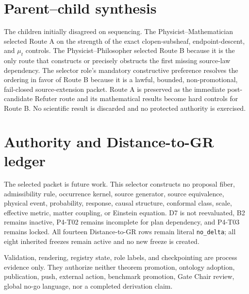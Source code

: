 \documentclass[11pt]{article}
\begin{document}
\section{Parent--child synthesis}

The children initially disagreed on sequencing. The Physicist--Mathematician
selected Route A on the strength of the exact clopen-subsheaf, endpoint-descent,
and \(\mu_t\) controls. The Physicist--Philosopher selected Route B because it
is the only route that constructs or precisely obstructs the first missing
source-law dependency. The selector role's mandatory constructive preference
resolves the ordering in favor of Route B because it is a lawful, bounded,
non-promotional, fail-closed source-extension packet. Route A is preserved as
the immediate post-candidate Refuter route and its mathematical results become
hard controls for Route B. No scientific result is discarded and no protected
authority is exercised.

\section{Authority and Distance-to-GR ledger}

The selected packet is future work. This selector constructs no proposal fiber,
admissibility rule, occurrence kernel, source generator, source equivalence,
physical event, probability, response, causal structure, conformal class,
scale, effective metric, matter coupling, or Einstein equation. D7 is not
reevaluated, B2 remains inactive, P4-T02 remains incomplete for plan
dependency, and P4-T03 remains locked. All fourteen Distance-to-GR rows remain
literal \texttt{no\_delta}; all eight inherited freezes remain active and no
new freeze is created.

Validation, rendering, registry state, role labels, and checkpointing are
process evidence only. They authorize neither theorem promotion, ontology
adoption, publication, push, external action, benchmark promotion, Gate Chair
review, global no-go language, nor a completed derivation claim.
\end{document}
